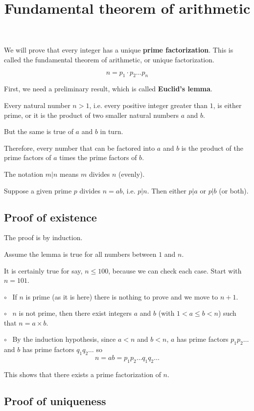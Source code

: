 \documentclass[11pt, oneside]{article}
\title{Fundamental theorem of arithmetic}
\date{}
\begin{document}
\maketitle
\Large

We will prove that every integer has a unique \textbf{prime factorization}.  This is called the fundamental theorem of arithmetic, or unique factorization.

\[ n = p_1 \cdot p_2 \dots p_n \]

First, we need a preliminary result, which is called \textbf{Euclid's lemma}.

Every natural number $n > 1$, i.e. every positive integer greater than $1$, is either prime, or it is the product of two smaller natural numbers $a$ and $b$.

But the same is true of $a$ and $b$ in turn.

Therefore, every number that can be factored into $a$ and $b$ is the product of the prime factors of $a$ times the prime factors of $b$.  

The notation $m|n$ means $m$ divides $n$ (evenly).

Suppose a given prime $p$ divides $n = ab$, i.e. $p|n$.  Then either $p|a$ or  $p|b$ (or both).

\subsection*{Proof of existence}

The proof is by induction.

Assume the lemma is true for all numbers between $1$ and $n$.  

It is certainly true for say, $n \le 100$, because we can check each case.  Start with $n = 101$.

$\circ$ \ If $n$ is prime (as it is here) there is nothing to prove and we move to $n + 1$.  

$\circ$ \  $n$ is not prime, then there exist integers $a$ and $b$ (with $1 < a \le b < n$) such that $n = a \times b$.

$\circ$ \ By the induction hypothesis, since $a < n$ and $b < n$, $a$ has prime factors $p_1 p_2 \dots$ and $b$ has prime factors $q_1 q_2 \dots$ so
\[ n = ab = p_1 p_2 \dots q_1 q_2 \dots \]

This shows that there exists a prime factorization of $n$.

\subsection*{Proof of uniqueness}
\end{document}

